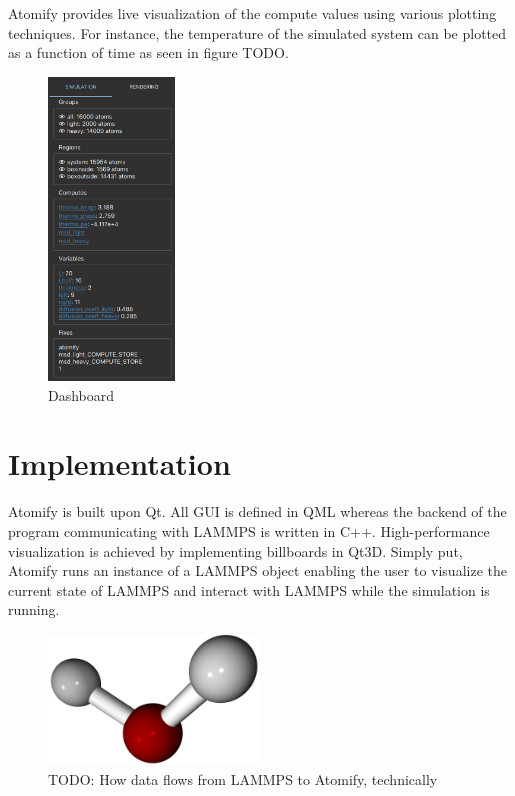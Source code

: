 \documentclass[aps,pre,twocolumn,letterpaper,floatfix,nofootinbib]{revtex4}
\begin{document}
Atomify provides live visualization of the compute values using various plotting
techniques.
For instance, the temperature of the simulated system can be plotted as a
function of time as seen in figure TODO.

\begin{figure}
	\centering
	\includegraphics[width=0.3\textwidth]{dashboard.png}
	\caption{Dashboard}
	\label{fig:gui}
\end{figure}


\section{Implementation}

Atomify is built upon Qt.
All GUI is defined in QML whereas the backend of the program communicating with
LAMMPS is written in C++.
High-performance visualization is achieved by implementing billboards in Qt3D.
Simply put, Atomify runs an instance of a LAMMPS object enabling the user to
visualize the current state of LAMMPS and interact with LAMMPS while the
simulation is running. 

\begin{figure}
	\centering
	\includegraphics[width=0.5\textwidth]{final_billboard.png}
	\caption{TODO: How data flows from LAMMPS to Atomify, technically}
	\label{fig:gui}
\end{figure}
\end{document}
